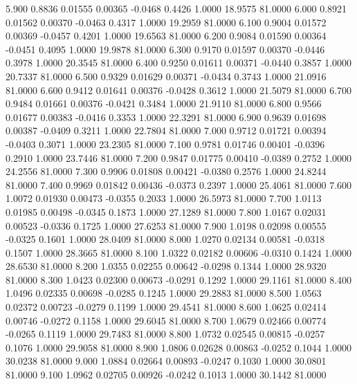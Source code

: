    5.900   0.8836   0.01555   0.00365  -0.0468   0.4426   1.0000  18.9575  81.0000
   6.000   0.8921   0.01562   0.00370  -0.0463   0.4317   1.0000  19.2959  81.0000
   6.100   0.9004   0.01572   0.00369  -0.0457   0.4201   1.0000  19.6563  81.0000
   6.200   0.9084   0.01590   0.00364  -0.0451   0.4095   1.0000  19.9878  81.0000
   6.300   0.9170   0.01597   0.00370  -0.0446   0.3978   1.0000  20.3545  81.0000
   6.400   0.9250   0.01611   0.00371  -0.0440   0.3857   1.0000  20.7337  81.0000
   6.500   0.9329   0.01629   0.00371  -0.0434   0.3743   1.0000  21.0916  81.0000
   6.600   0.9412   0.01641   0.00376  -0.0428   0.3612   1.0000  21.5079  81.0000
   6.700   0.9484   0.01661   0.00376  -0.0421   0.3484   1.0000  21.9110  81.0000
   6.800   0.9566   0.01677   0.00383  -0.0416   0.3353   1.0000  22.3291  81.0000
   6.900   0.9639   0.01698   0.00387  -0.0409   0.3211   1.0000  22.7804  81.0000
   7.000   0.9712   0.01721   0.00394  -0.0403   0.3071   1.0000  23.2305  81.0000
   7.100   0.9781   0.01746   0.00401  -0.0396   0.2910   1.0000  23.7446  81.0000
   7.200   0.9847   0.01775   0.00410  -0.0389   0.2752   1.0000  24.2556  81.0000
   7.300   0.9906   0.01808   0.00421  -0.0380   0.2576   1.0000  24.8244  81.0000
   7.400   0.9969   0.01842   0.00436  -0.0373   0.2397   1.0000  25.4061  81.0000
   7.600   1.0072   0.01930   0.00473  -0.0355   0.2033   1.0000  26.5973  81.0000
   7.700   1.0113   0.01985   0.00498  -0.0345   0.1873   1.0000  27.1289  81.0000
   7.800   1.0167   0.02031   0.00523  -0.0336   0.1725   1.0000  27.6253  81.0000
   7.900   1.0198   0.02098   0.00555  -0.0325   0.1601   1.0000  28.0409  81.0000
   8.000   1.0270   0.02134   0.00581  -0.0318   0.1507   1.0000  28.3665  81.0000
   8.100   1.0322   0.02182   0.00606  -0.0310   0.1424   1.0000  28.6530  81.0000
   8.200   1.0355   0.02255   0.00642  -0.0298   0.1344   1.0000  28.9320  81.0000
   8.300   1.0423   0.02300   0.00673  -0.0291   0.1292   1.0000  29.1161  81.0000
   8.400   1.0496   0.02335   0.00698  -0.0285   0.1245   1.0000  29.2883  81.0000
   8.500   1.0563   0.02372   0.00723  -0.0279   0.1199   1.0000  29.4541  81.0000
   8.600   1.0625   0.02414   0.00746  -0.0272   0.1158   1.0000  29.6045  81.0000
   8.700   1.0679   0.02466   0.00774  -0.0265   0.1119   1.0000  29.7483  81.0000
   8.800   1.0732   0.02545   0.00815  -0.0257   0.1076   1.0000  29.9058  81.0000
   8.900   1.0806   0.02628   0.00863  -0.0252   0.1044   1.0000  30.0238  81.0000
   9.000   1.0884   0.02664   0.00893  -0.0247   0.1030   1.0000  30.0801  81.0000
   9.100   1.0962   0.02705   0.00926  -0.0242   0.1013   1.0000  30.1442  81.0000
